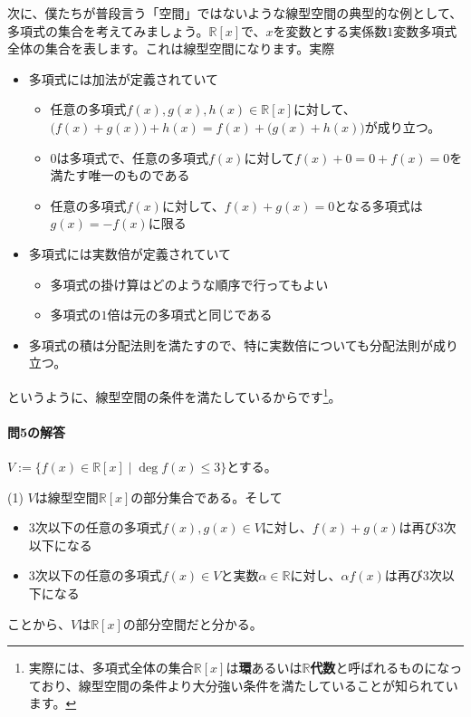 次に、僕たちが普段言う「空間」ではないような線型空間の典型的な例として、多項式の集合を考えてみましょう。$\mathbb{R}[x]$で、$x$を変数とする実係数$1$変数多項式全体の集合を表します。これは線型空間になります。実際
\begin{itemize}
\item 多項式には加法が定義されていて
\begin{itemize}
\item 任意の多項式$f(x), g(x), h(x)\in\mathbb{R}[x]$に対して、$\bigl(f(x) + g(x)\bigr) + h(x) = f(x) + \bigl(g(x) + h(x)\bigr)$が成り立つ。
\item $0$は多項式で、任意の多項式$f(x)$に対して$f(x) + 0 = 0 + f(x) = 0$を満たす唯一のものである
\item 任意の多項式$f(x)$に対して、$f(x) + g(x) = 0$となる多項式は$g(x) = -f(x)$に限る
\end{itemize}
\item 多項式には実数倍が定義されていて
\begin{itemize}
\item 多項式の掛け算はどのような順序で行ってもよい
\item 多項式の$1$倍は元の多項式と同じである
\end{itemize}
\item 多項式の積は分配法則を満たすので、特に実数倍についても分配法則が成り立つ。
\end{itemize}
というように、線型空間の条件を満たしているからです\footnote{実際には、多項式全体の集合$\mathbb{R}[x]$は\textbf{環}あるいは\textbf{$\mathbb{R}$代数}と呼ばれるものになっており、線型空間の条件より大分強い条件を満たしていることが知られています。}。

\paragraph{問5の解答} \label{paragraph:evaluation_map}
$V:= \{f(x)\in\mathbb{R}[x] \mid \deg f(x) \leq 3\}$とする。

\noindent (1) $V$は線型空間$\mathbb{R}[x]$の部分集合である。そして
\begin{itemize}
\item $3$次以下の任意の多項式$f(x), g(x)\in V$に対し、$f(x) + g(x)$は再び$3$次以下になる
\item $3$次以下の任意の多項式$f(x) \in V$と実数$\alpha \in\mathbb{R}$に対し、$\alpha f(x)$は再び$3$次以下になる
\end{itemize}
ことから、$V$は$\mathbb{R}[x]$の部分空間だと分かる。

